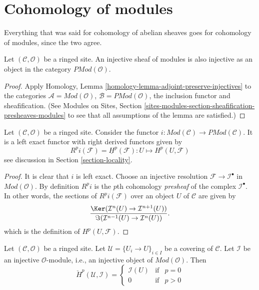 \section{Cohomology of modules}
\label{section-cohomology-modules}

\noindent
Everything that was said for cohomology of abelian sheaves
goes for cohomology of modules, since the two agree.

\begin{lemma}
\label{lemma-injective-module-injective-presheaf}
Let $(\mathcal{C}, \mathcal{O})$ be a ringed site.
An injective sheaf of modules is also injective as an
object in the category $\textit{PMod}(\mathcal{O})$.
\end{lemma}

\begin{proof}
Apply Homology, Lemma \ref{homology-lemma-adjoint-preserve-injectives}
to the categories $\mathcal{A} = \textit{Mod}(\mathcal{O})$,
$\mathcal{B} = \textit{PMod}(\mathcal{O})$, the inclusion functor
and sheafification. (See
Modules on Sites,
Section \ref{sites-modules-section-sheafification-presheaves-modules}
to see that all assumptions of the lemma are satisfied.)
\end{proof}

\begin{lemma}
\label{lemma-include-modules}
Let $(\mathcal{C}, \mathcal{O})$ be a ringed site.
Consider the functor
$i : \textit{Mod}(\mathcal{C}) \to \textit{PMod}(\mathcal{C})$.
It is a left exact functor with right derived functors given by
$$
R^pi(\mathcal{F}) = \underline{H}^p(\mathcal{F}) :
U \longmapsto H^p(U, \mathcal{F})
$$
see discussion in
Section \ref{section-locality}.
\end{lemma}

\begin{proof}
It is clear that $i$ is left exact.
Choose an injective resolution $\mathcal{F} \to \mathcal{I}^\bullet$
in $\textit{Mod}(\mathcal{O})$.
By definition $R^pi$ is the $p$th cohomology {\it presheaf}
of the complex $\mathcal{I}^\bullet$. In other words, the
sections of $R^pi(\mathcal{F})$ over an object $U$ of $\mathcal{C}$
are given by
$$
\frac{\Ker(\mathcal{I}^n(U) \to \mathcal{I}^{n + 1}(U))}
{\Im(\mathcal{I}^{n - 1}(U) \to \mathcal{I}^n(U))}.
$$
which is the definition of $H^p(U, \mathcal{F})$.
\end{proof}

\begin{lemma}
\label{lemma-injective-module-trivial-cech}
Let $(\mathcal{C}, \mathcal{O})$ be a ringed site.
Let $\mathcal{U} = \{U_i \to U\}_{i \in I}$ be a covering of $\mathcal{C}$.
Let $\mathcal{I}$ be an injective $\mathcal{O}$-module, i.e., an injective
object of $\textit{Mod}(\mathcal{O})$. Then
$$
\check{H}^p(\mathcal{U}, \mathcal{I}) =
\left\{
\begin{matrix}
\mathcal{I}(U) & \text{if} & p = 0 \\
0 & \text{if} & p > 0
\end{matrix}
\right.
$$
\end{lemma}

